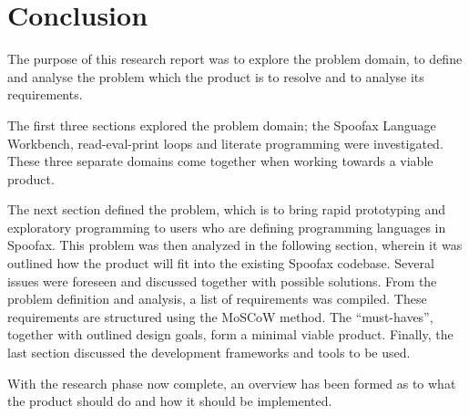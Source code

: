 \section{Conclusion}
\label{sec:conclusion}

The purpose of this research report was to explore the problem domain, to define
and analyse the problem which the product is to resolve and to analyse its
requirements.

The first three sections explored the problem domain; the Spoofax Language
Workbench, read-eval-print loops and literate programming were investigated.
These three separate domains come together when working towards a viable product.

The next section defined the problem, which is to bring rapid prototyping and
exploratory programming to users who are defining programming languages in
Spoofax. This problem was then analyzed in the following section, wherein it
was outlined how the product will fit into the existing Spoofax codebase.
Several issues were foreseen and discussed together with possible solutions.
From the problem definition and analysis, a list of requirements was compiled.
These requirements are structured using the MoSCoW method. The ``must-haves'',
together with outlined design goals, form a minimal viable product. Finally,
the last section discussed the development frameworks and tools to be used.

With the research phase now complete, an overview has been formed as to what the
product should do and how it should be implemented.

